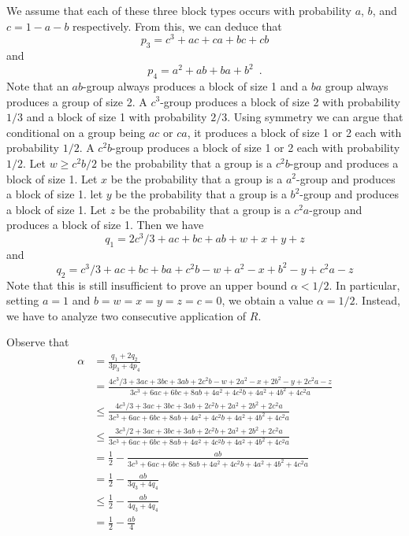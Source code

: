 \documentclass{patmorin}
\begin{document}
We assume that each of these three block types occurs with probability
$a$, $b$, and $c=1-a-b$ respectively.  From this, we can deduce that
\[
    p_3 = c^3 + ac + ca + bc + cb
\]
and
\[
    p_4 = a^2 + ab + ba + b^2 \enspace .
\]
Note that an $ab$-group always produces a block of size 1 and a $ba$ group
always produces a group of size 2.  A $c^3$-group produces a block of size
2 with probability $1/3$ and a block of size 1 with probability $2/3$.
Using symmetry we can argue that conditional on a group being $ac$ or $ca$, it produces a block of size 1 or 2 each with probability $1/2$.
A $c^2b$-group produces a block of size 1 or 2 each with probability $1/2$.
Let $w\ge c^2b/2$ be the probability that a group is a $c^2b$-group and produces a block of size 1.
Let $x$ be the probability that a group is a $a^2$-group and produces a block of size 1.
let $y$ be the probability that a group is a $b^2$-group and produces a block of size 1.
Let $z$ be the probability that a group is a $c^2a$-group and produces a block of size 1.
Then we have
\[
    q_1 = 2c^3/3 + ac + bc + ab + w + x + y + z
\]
and 
\[
    q_2 = c^3/3 + ac + bc + ba + c^2b - w + a^2 - x + b^2 -y+ c^2a-z
\]
Note that this is still insufficient to prove an upper bound $\alpha
< 1/2$. In particular, setting $a = 1$ and $b=w=x=y=z=c=0$, we obtain
a value $\alpha=1/2$.  Instead, we have to
analyze two consecutive application of $R$.  

Observe that
\begin{align*}
  \alpha & = \frac{q_1+2q_2}{3p_3 + 4p_4} \\
     & = \frac
        {4c^3/3 + 3ac + 3bc + 3ab + 2c^2b -w + 2a^2 - x + 2b^2 - y + 2c^2a -z}
        {3c^3 + 6ac + 6bc + 8ab + 4a^2 + 4c^2b + 4a^2 + 4b^2 + 4c^2a} \\
     & \le \frac
        {4c^3/3 + 3ac + 3bc + 3ab + 2c^2b + 2a^2 + 2b^2  + 2c^2a}
        {3c^3 + 6ac + 6bc + 8ab + 4a^2 + 4c^2b + 4a^2 + 4b^2 + 4c^2a} \\
     & \le \frac
        {3c^3/2 + 3ac + 3bc + 3ab + 2c^2b + 2a^2 + 2b^2  + 2c^2a}
        {3c^3 + 6ac + 6bc + 8ab + 4a^2 + 4c^2b + 4a^2 + 4b^2 + 4c^2a} \\
     & = \frac{1}{2}- 
        \frac{ab}
        {3c^3 + 6ac + 6bc + 8ab + 4a^2 + 4c^2b + 4a^2 + 4b^2 + 4c^2a} \\
     & = \frac{1}{2}- 
        \frac{ab}{3q_3 + 4q_4} \\
     & \le \frac{1}{2}- 
        \frac{ab}{4q_3 + 4q_4} \\
     & = \frac{1}{2}- 
        \frac{ab}{4}
\end{align*}
\end{document}
